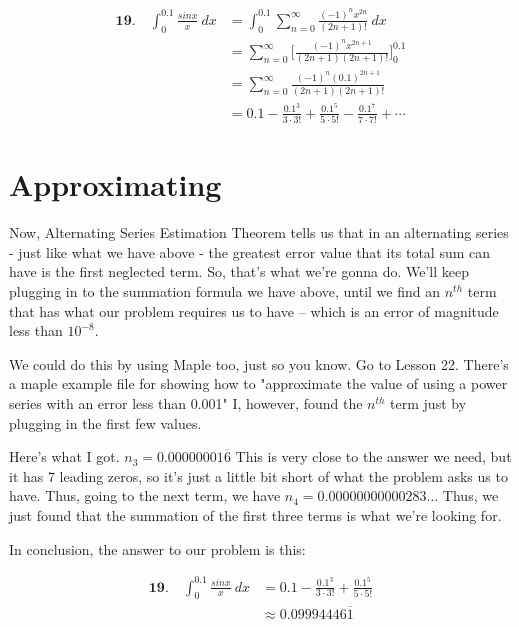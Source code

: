 \begin{align}
	\textbf{19.}\quad \int_{0}^{0.1} 
	\frac{sinx}{x}\ dx
	&=
	\int_{0}^{0.1}
	\sum_{n=0}^{\infty}
	\frac{
		(-1)^nx^{2n}
	}{
		(2n+1)!
	}\ dx \\
	&=
	\sum_{n=0}^{\infty}
	\Bigg[
	\frac{
		(-1)^nx^{2n+1}
	}{
		(2n+1)
		(2n+1)!
	}
	\Bigg]_0^{0.1} \\
	&=
	\sum_{n=0}^{\infty}
	\frac{
		(-1)^n(0.1)^{2n+1}
	}{
		(2n+1)
		(2n+1)!
	} \\
	&=
	0.1 
	-
	\frac{
		0.1^{3}
	}{
	    3\cdot3!
	}
	+
	\frac{
		0.1^{5}
	}{
		5\cdot5!
	}
	-
	\frac{
		0.1^{7}
	}{
		7\cdot7!
	}
	+
	\cdots
\end{align}

\section*{Approximating}

Now, Alternating Series
Estimation Theorem tells us
that in an alternating series
- just like what we have above -
the greatest error value 
that its total sum can have 
is the first neglected term.
So, that's what we're gonna do.
We'll keep plugging in to the
summation formula we have above,
until we find an $ n^{th} $ term
that has what our problem requires
us to have -- which is an error
of magnitude less than $ 10^{-8} $.

We could do this by using Maple too,
just so you know. 
Go to Lesson 22. 
There's a maple example file for
showing how to "approximate the value of  using a power series with an error less than 0.001"
I, however, found the $ n^{th} $ term
just by plugging in the first few values.

Here's what I got. 
$ n_3 = 0.00000001\overline{6} $
This is very close to the answer we
need, but it has 7 leading zeros, so
it's just a little bit short of what
the problem asks us to have. Thus,
going to the next term, we have
$ n_4 = 0.00000000000283\ldots $
Thus, we just found that the
summation of the first three terms
is what we're looking for. 

In conclusion, the answer to
our problem is this:

\begin{align}
	\textbf{19.}\quad \int_{0}^{0.1} 
	\frac{sinx}{x}\ dx
	&=
	0.1 
	-
	\frac{
		0.1^{3}
	}{
		3\cdot3!
	}
	+
	\frac{
		0.1^{5}
	}{
		5\cdot5!
	} \\
	&\approx
	0.09994446\overline{1}
\end{align}

